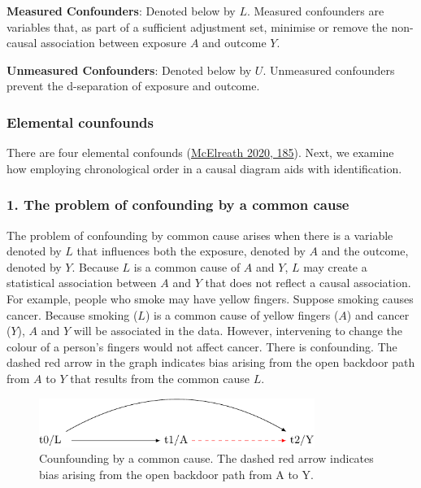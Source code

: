 \documentclass[
  singlecolumn]{article}
\begin{document}
\textbf{Measured Confounders}: Denoted below by \(L\). Measured
confounders are variables that, as part of a sufficient adjustment set,
minimise or remove the non-causal association between exposure \(A\) and
outcome \(Y\).

\textbf{Unmeasured Confounders}: Denoted below by \(U\). Unmeasured
confounders prevent the d-separation of exposure and outcome.

\hypertarget{elemental-counfounds}{%
\subsubsection{Elemental counfounds}\label{elemental-counfounds}}

There are four elemental confounds
(\protect\hyperlink{ref-mcelreath2020}{McElreath 2020, 185}). Next, we
examine how employing chronological order in a causal diagram aids with
identification.

\hypertarget{the-problem-of-confounding-by-a-common-cause}{%
\subsubsection{1. The problem of confounding by a common
cause}\label{the-problem-of-confounding-by-a-common-cause}}

The problem of confounding by common cause arises when there is a
variable denoted by \(L\) that influences both the exposure, denoted by
\(A\) and the outcome, denoted by \(Y.\) Because \(L\) is a common cause
of \(A\) and \(Y\), \(L\) may create a statistical association between
\(A\) and \(Y\) that does not reflect a causal association. For example,
people who smoke may have yellow fingers. Suppose smoking causes cancer.
Because smoking (\(L\)) is a common cause of yellow fingers (\(A\)) and
cancer (\(Y\)), \(A\) and \(Y\) will be associated in the data. However,
intervening to change the colour of a person's fingers would not affect
cancer. There is confounding. The dashed red arrow in the graph
indicates bias arising from the open backdoor path from \(A\) to \(Y\)
that results from the common cause \(L\).

\begin{figure}

{\centering \includegraphics[width=0.8\textwidth,height=\textheight]{causal-dags_files/figure-pdf/fig-dag-common-cause-1.pdf}

}

\caption{\label{fig-dag-common-cause}Counfounding by a common cause. The
dashed red arrow indicates bias arising from the open backdoor path from
A to Y.}

\end{figure}
\end{document}
